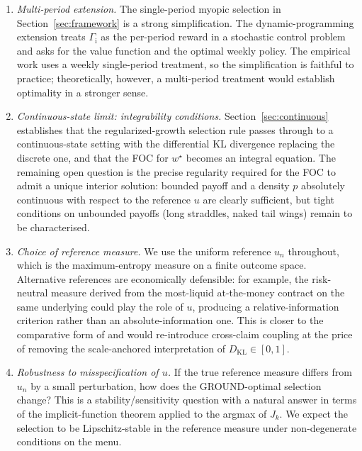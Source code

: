 \documentclass[11pt]{article}
\theoremstyle{definition}
\theoremstyle{remark}
\newcommand{\KL}{D_{\mathrm{KL}}}
\newcommand{\GROUND}{\Gamma_{\mathrm{i}}}
\begin{document}
\begin{enumerate}
    \item \emph{Multi-period extension.}
        The single-period myopic selection in Section~\ref{sec:framework}
        is a strong simplification. The dynamic-programming extension
        treats $\GROUND$ as the per-period reward in a stochastic
        control problem and asks for the value function and the
        optimal weekly policy. The empirical work uses a weekly
        single-period treatment, so the simplification is faithful to
        practice; theoretically, however, a multi-period treatment
        would establish optimality in a stronger sense.
    \item \emph{Continuous-state limit: integrability conditions.}
        Section~\ref{sec:continuous} establishes that the
        regularized-growth selection rule passes through to a
        continuous-state setting with the differential KL divergence
        replacing the discrete one, and that the FOC for $w^\star$
        becomes an integral equation. The remaining open question is
        the precise regularity required for the FOC to admit a unique
        interior solution: bounded payoff and a density $p$ absolutely
        continuous with respect to the reference $u$ are clearly
        sufficient, but tight conditions on unbounded payoffs (long
        straddles, naked tail wings) remain to be characterised.
    \item \emph{Choice of reference measure.}
        We use the uniform reference $u_n$ throughout, which is the
        maximum-entropy measure on a finite outcome space. Alternative
        references are economically defensible: for example, the
        risk-neutral measure derived from the most-liquid at-the-money
        contract on the same underlying could play the role of $u$,
        producing a relative-information criterion rather than an
        absolute-information one. This is closer to the comparative
        form of \citet{mercurio2020} and would re-introduce
        cross-claim coupling at the price of removing the
        scale-anchored interpretation of $\KL \in [0, 1]$.
    \item \emph{Robustness to misspecification of $u$.}
        If the true reference measure differs from $u_n$ by a
        small perturbation, how does the GROUND-optimal selection
        change? This is a stability/sensitivity question with a
        natural answer in terms of the implicit-function theorem
        applied to the argmax of $J_k$. We expect the selection to be
        Lipschitz-stable in the reference measure under
        non-degenerate conditions on the menu.
\end{enumerate}
\end{document}
